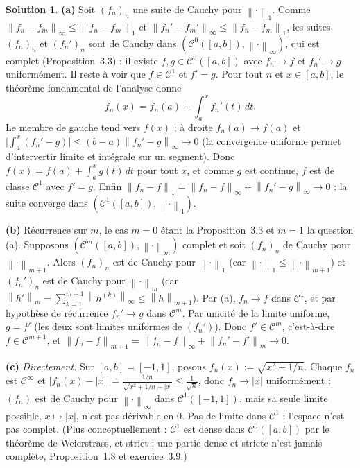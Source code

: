 \documentclass[11pt,a4paper]{article}
\newcommand{\norm}[1]{\left\|#1\right\|}
\newcommand{\Cz}{\mathcal{C}^0}
\newcommand{\ie}{c'est-à-dire}
\theoremstyle{definition}
\newtheorem*{solution}{Solution}
\begin{document}
\begin{solution}
\noindent\textbf{(a)} Soit $(f_n)_n$ une suite de Cauchy pour $\norm\cdot_1$. Comme $\norm{f_n-f_m}_\infty\le\norm{f_n-f_m}_1$ et $\norm{f_n'-f_m'}_\infty\le\norm{f_n-f_m}_1$, les suites $(f_n)_n$ et $(f_n')_n$ sont de Cauchy dans $(\Cz([a,b]),\norm\cdot_\infty)$, qui est complet (Proposition~3.3) : il existe $f,g\in\Cz([a,b])$ avec $f_n\to f$ et $f_n'\to g$ uniformément. Il reste à voir que $f\in\mathcal C^1$ et $f'=g$. Pour tout $n$ et $x\in[a,b]$, le théorème fondamental de l'analyse donne
\[
f_n(x)=f_n(a)+\int_a^xf_n'(t)\,dt .
\]
Le membre de gauche tend vers $f(x)$ ; à droite $f_n(a)\to f(a)$ et $\big|\int_a^x(f_n'-g)\big|\le(b-a)\norm{f_n'-g}_\infty\to0$ (la convergence uniforme permet d'intervertir limite et intégrale sur un segment). Donc $f(x)=f(a)+\int_a^xg(t)\,dt$ pour tout $x$, et comme $g$ est continue, $f$ est de classe $\mathcal C^1$ avec $f'=g$. Enfin $\norm{f_n-f}_1=\norm{f_n-f}_\infty+\norm{f_n'-g}_\infty\to0$ : la suite converge dans $(\mathcal C^1([a,b]),\norm\cdot_1)$.

\medskip
\noindent\textbf{(b)} Récurrence sur $m$, le cas $m=0$ étant la Proposition~3.3 et $m=1$ la question (a). Supposons $(\mathcal C^{m}([a,b]),\norm\cdot_{m})$ complet et soit $(f_n)_n$ de Cauchy pour $\norm\cdot_{m+1}$. Alors $(f_n)_n$ est de Cauchy pour $\norm\cdot_1$ (car $\norm\cdot_1\le\norm\cdot_{m+1}$) et $(f_n')_n$ est de Cauchy pour $\norm\cdot_m$ (car $\norm{h'}_m=\sum_{k=1}^{m+1}\norm{h^{(k)}}_\infty\le\norm h_{m+1}$). Par (a), $f_n\to f$ dans $\mathcal C^1$, et par hypothèse de récurrence $f_n'\to g$ dans $\mathcal C^m$. Par unicité de la limite uniforme, $g=f'$ (les deux sont limites uniformes de $(f_n')$). Donc $f'\in\mathcal C^m$, \ie{} $f\in\mathcal C^{m+1}$, et $\norm{f_n-f}_{m+1}=\norm{f_n-f}_\infty+\norm{f_n'-f'}_m\to0$.

\medskip
\noindent\textbf{(c)} \emph{Directement.} Sur $[a,b]=[-1,1]$, posons $f_n(x):=\sqrt{x^2+1/n}$. Chaque $f_n$ est $\mathcal C^\infty$ et $|f_n(x)-|x||=\frac{1/n}{\sqrt{x^2+1/n}+|x|}\le\frac1{\sqrt n}$, donc $f_n\to|x|$ uniformément : $(f_n)$ est de Cauchy pour $\norm\cdot_\infty$ dans $\mathcal C^1([-1,1])$, mais sa seule limite possible, $x\mapsto|x|$, n'est pas dérivable en $0$. Pas de limite dans $\mathcal C^1$ : l'espace n'est pas complet. (Plus conceptuellement : $\mathcal C^1$ est dense dans $\Cz([a,b])$ par le théorème de Weierstrass, et strict ; une partie dense et stricte n'est jamais complète, Proposition~1.8 et exercice~3.9.)


\end{solution}
\end{document}
